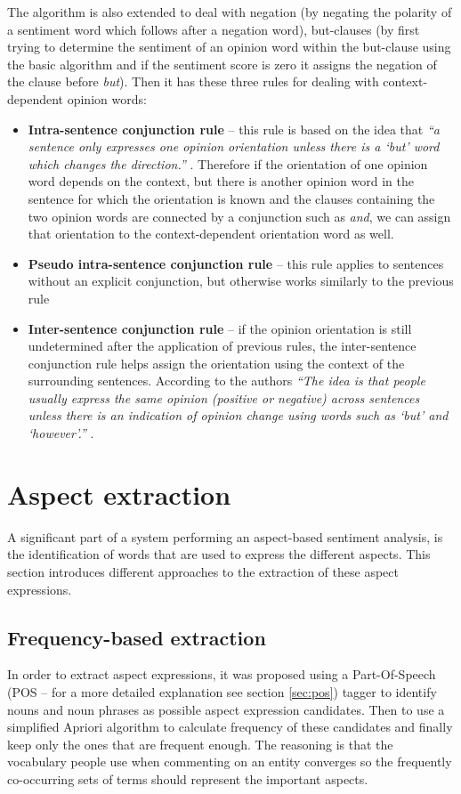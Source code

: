 The algorithm is also extended to deal with negation (by negating the polarity of a sentiment word which follows after a negation word), but-clauses (by first trying to determine the sentiment of an opinion word within the but-clause using the basic algorithm and if the sentiment score is zero it assigns the negation of the clause before \textit{but}). Then it has these three rules for dealing with context-dependent opinion words:
\begin{itemize}
\item \textbf{Intra-sentence conjunction rule} -- this rule is based on the idea that \textit{``a sentence only expresses one opinion
orientation unless there is a `but' word which changes the
direction.''} \cite[p. 6]{ding_hu_liu}. Therefore if the orientation of one opinion word depends on the context, but there is another opinion word in the sentence for which the orientation is known and the clauses containing the two opinion words are connected by a conjunction such as \textit{and}, we can assign that orientation to the context-dependent orientation word as well.
\item \textbf{Pseudo intra-sentence conjunction rule} -- this rule applies to sentences without an explicit conjunction, but otherwise works similarly to the previous rule
\item \textbf{Inter-sentence conjunction rule} -- if the opinion orientation is still undetermined after the application of previous rules, the inter-sentence conjunction rule helps assign the orientation using the context of the surrounding sentences. According to the authors \textit{``The idea is that people usually express the same
opinion (positive or negative) across sentences unless there is
an indication of opinion change using words such as `but' and
`however'.''} \cite[p. 6]{ding_hu_liu}.
\end{itemize}
\section{Aspect extraction}
A significant part of a system performing an aspect-based sentiment analysis, is the identification of words that are used to express the different aspects. This section introduces different approaches to the extraction of these aspect expressions.
\subsection{Frequency-based extraction}
\label{sec:freq_extr_t}
In order to extract aspect expressions, it was  proposed using a Part-Of-Speech (POS -- for a more detailed explanation see section \ref{sec:pos}) tagger to identify nouns and noun phrases as possible aspect expression candidates. Then to use a simplified Apriori algorithm to calculate frequency of these candidates and finally keep only the ones that are frequent enough. 
The reasoning is that the vocabulary people use when commenting on an entity converges so the frequently co-occurring sets of terms should represent the important aspects.  \cite{hu_liu_2015}
